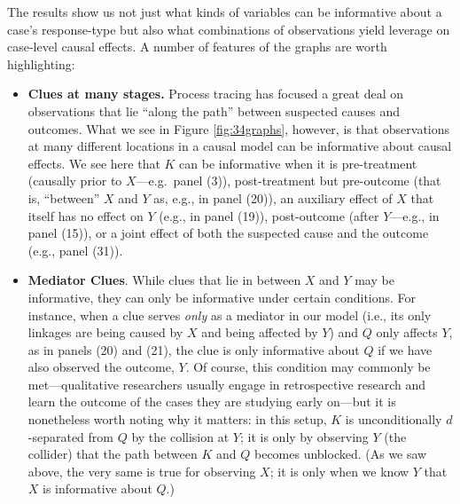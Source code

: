 \documentclass[
  12pt,
]{book}
\begin{document}
The results show us not just what kinds of variables can be informative about a case's response-type but also what combinations of observations yield leverage on case-level causal effects. A number of features of the graphs are worth highlighting:

\begin{itemize}
\item
  \textbf{Clues at many stages.} Process tracing has focused a great deal on observations that lie ``along the path'' between suspected causes and outcomes. What we see in Figure \ref{fig:34graphs}, however, is that observations at many different locations in a causal model can be informative about causal effects. We see here that \(K\) can be informative when it is pre-treatment (causally prior to \(X\)---e.g.~panel (3)), post-treatment but pre-outcome (that is, ``between'' \(X\) and \(Y\) as, e.g., in panel (20)), an auxiliary effect of \(X\) that itself has no effect on \(Y\) (e.g., in panel (19)), post-outcome (after \(Y\)---e.g., in panel (15)), or a joint effect of both the suspected cause and the outcome (e.g., panel (31)).
\item
  \textbf{Mediator Clues}. While clues that lie in between \(X\) and \(Y\) may be informative, they can only be informative under certain conditions. For instance, when a clue serves \emph{only} as a mediator in our model (i.e., its only linkages are being caused by \(X\) and being affected by \(Y\)) and \(Q\) only affects \(Y\), as in panels (20) and (21), the clue is only informative about \(Q\) if we have also observed the outcome, \(Y\). Of course, this condition may commonly be met---qualitative researchers usually engage in retrospective research and learn the outcome of the cases they are studying early on---but it is nonetheless worth noting why it matters: in this setup, \(K\) is unconditionally \(d\)-separated from \(Q\) by the collision at \(Y\); it is only by observing \(Y\) (the collider) that the path between \(K\) and \(Q\) becomes unblocked. (As we saw above, the very same is true for observing \(X\); it is only when we know \(Y\) that \(X\) is informative about \(Q\).)
\end{itemize}
\end{document}
